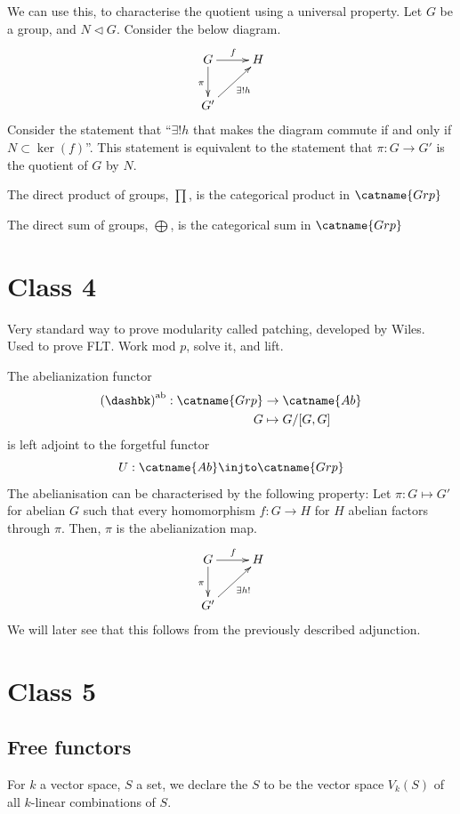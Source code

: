 \documentclass[12pt]{scrartcl}
\begin{document}
We can use this, to characterise the quotient using a universal property.
Let $G$ be a group, and $N \triangleleft G$. 
Consider the below diagram.
\[
\xymatrix{
	G\ar[d]_{\pi} \ar[r]^{f} & H \\
	G' \ar[ur]_{\exists!h} & \\
}
\]
Consider the statement that ``$\exists ! h$ that makes the diagram commute if and only if $N \subset \ker(f)$''.
This statement is equivalent to the statement that $\pi: G \to G'$ is the quotient of $G$ by $N$.

The direct product of groups, $\prod$, is the categorical product in $\catname{Grp}$

The direct sum of groups, $\bigoplus$, is the categorical sum in $\catname{Grp}$ 

\section{Class 4}
Very standard way to prove modularity called patching, developed by Wiles. 
Used to prove FLT.
Work mod $p$, solve it, and lift.

The abelianization functor
\begin{align*}
	\left(\dashbk\right)^{\textrm{ab}}: \catname{Grp} &\to \catname{Ab} \\
	G &\mapsto G/[G, G] \\
\end{align*}
is left adjoint to the forgetful functor
\[
U: \catname{Ab} \injto \catname{Grp} 
\]
The abelianisation can be characterised by the following property:
Let $\pi: G \mapsto G'$ for abelian $G$ such that every homomorphism $f: G\to H$ for $H$ abelian factors through $\pi$.
Then, $\pi$ is the abelianization map.
\[
\xymatrix{
G \ar[d]_{\pi} \ar[r]^{f} & H \\
G' \ar[ur]_{\exists h!} & \\
}
\] 
We will later see that this follows from the previously described adjunction.

\section{Class 5}
\subsection{Free functors}
For $k$ a vector space, $S$ a set, we declare the  $S$ to be the vector space $V_k(S)$ of all $k$-linear combinations of $S$.
\end{document}
